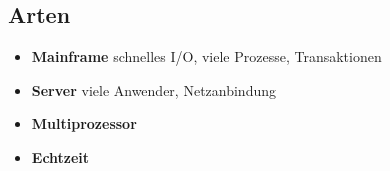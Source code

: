 \subsection{Arten}
\begin{itemize}
    \item \textbf{Mainframe}
        schnelles I/O, viele Prozesse, Transaktionen
    \item \textbf{Server}
        viele Anwender, Netzanbindung    
    \item \textbf{Multiprozessor}
    \item \textbf{Echtzeit}
\end{itemize}